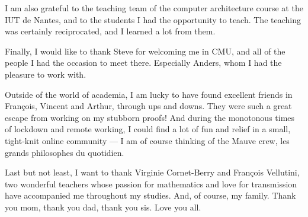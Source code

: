 I am also grateful to the teaching team of the computer architecture course at the 
IUT de Nantes, and to the students I had the opportunity to teach. 
The teaching was certainly reciprocated, and I learned a lot from them. 

Finally, I would like to thank Steve for welcoming me in CMU, and all of the
people I had the occasion to meet there. Especially Anders, whom I had the
pleasure to work with.

Outside of the world of academia, I am lucky to have found excellent friends in
François, Vincent and Arthur, through ups and downs. They were such a great 
escape from working on my stubborn proofs!
% 
And during the monotonous times of lockdown and remote working, I could find a lot 
of fun and relief in a small, tight-knit online community --- I am of course thinking of the 
Mauve crew, les grands philosophes du quotidien.

Last but not least, I want to thank Virginie Cornet-Berry and 
François Vellutini, two wonderful teachers whose passion for mathematics and love 
for transmission have accompanied me throughout my studies. And, of course, my family.
Thank you mom, thank you dad, thank you sis. Love you all.